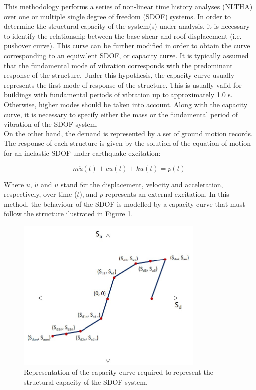 This methodology performs a series of non-linear time history analyses (NLTHA) over one or multiple single degree of freedom (SDOF) systems. In order to determine the structural capacity of the system(s) under analysis, it is necessary to identify the relationship between the base shear and roof displacement (i.e. pushover curve). This curve can be further modified in order to obtain the curve corresponding to an equivalent SDOF, or capacity curve. It is typically assumed that the fundamental mode of vibration corresponds with the predominant response of the structure. Under this hypothesis, the capacity curve usually represents the first mode of response of the structure. This is usually valid for buildings with fundamental periods of vibration up to approximately 1.0 s. Otherwise, higher modes should be taken into account. Along with the capacity curve, it is necessary to specify either the mass or the fundamental period of vibration of the SDOF system.\\

On the other hand, the demand is represented by a set of ground motion records. 
The response of each structure is given by the solution of the equation of motion for an inelastic SDOF under earthquake excitation:
	 
\begin{equation}
m\ddot{u}(t) + c\dot{u}(t) + ku(t) = p(t)
\end{equation}

Where $u$, $\dot{u}$ and $\ddot{u}$ stand for the displacement, velocity and acceleration, respectively, over time ($t$), and $p$ represents an external excitation. In this method, the behaviour of the SDOF is modelled by a capacity curve that must follow the structure ilustrated in Figure \ref{fig:backbone}. 

\begin{figure}[htb]
  \centering
      \includegraphics[width=9cm]{Figures/backbone_curve.png}
  \caption{Representation of the capacity curve required to represent the structural capacity of the SDOF system.}
  \label{fig:backbone}
\end{figure}

